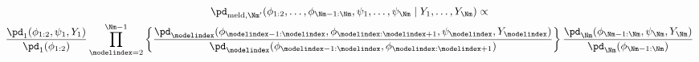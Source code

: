 \begin{multline}
  \pd_{\text{meld}, \Nm'}(\phi_{1:2}, \ldots, \phi_{\Nm - 1:\Nm}, \psi_{1}, \ldots, \psi_{\Nm} \mid Y_{1}, \ldots, Y_{\Nm}) \propto \\ 
  \frac {
      \pd_{1} (\phi_{1:2}, \psi_{1}, Y_{1})
    } {
      \pd_{1}(\phi_{1:2})
    }
  \prod_{\modelindex = 2}^{\Nm - 1} \left\{
    \frac {
      \pd_{\modelindex} (\phi_{\modelindex - 1:\modelindex}, \phi_{\modelindex:\modelindex + 1}, \psi_{\modelindex}, Y_{\modelindex})
    } {
      \pd_{\modelindex}(\phi_{\modelindex - 1:\modelindex}, \phi_{\modelindex:\modelindex + 1})
    }
  \right\}
  \frac {
    \pd_{\Nm} (\phi_{\Nm - 1:\Nm}, \psi_{\Nm}, Y_{\Nm})
  } {
    \pd_{\Nm}(\phi_{\Nm - 1:\Nm})
  }
  \label{eqn:stage-M-target}
\end{multline}